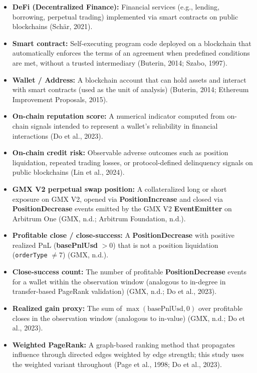 \begin{itemize}
\item[\textbullet] \textbf{DeFi (Decentralized Finance): }Financial services (e.g., lending, borrowing, perpetual trading) implemented via smart contracts on public blockchains (Sch\"{a}r, 2021).
\item[\textbullet] \textbf{Smart contract: }Self-executing program code deployed on a blockchain that automatically enforces the terms of an agreement when predefined conditions are met, without a trusted intermediary (Buterin, 2014; Szabo, 1997).
\item[\textbullet] \textbf{Wallet / Address: }A blockchain account that can hold assets and interact with smart contracts (used as the unit of analysis) (Buterin, 2014; Ethereum Improvement Proposals, 2015).
\item[\textbullet] \textbf{On-chain reputation score: }A numerical indicator computed from on-chain signals intended to represent a wallet's reliability in financial interactions (Do et al., 2023).
\item[\textbullet] \textbf{On-chain credit risk: }Observable adverse outcomes such as position liquidation, repeated trading losses, or protocol-defined delinquency signals on public blockchains (Lin et al., 2024).
\item[\textbullet] \textbf{GMX V2 perpetual swap position: }A collateralized long or short exposure on GMX V2, opened via \textbf{PositionIncrease} and closed via \textbf{PositionDecrease} events emitted by the GMX V2 \textbf{EventEmitter} on Arbitrum One (GMX, n.d.; Arbitrum Foundation, n.d.).
\item[\textbullet] \textbf{Profitable close / close-success: }A \textbf{PositionDecrease} with positive realized PnL (\textbf{basePnlUsd} $> 0$) that is not a position liquidation (\texttt{orderType} $\neq 7$) (GMX, n.d.).
\item[\textbullet] \textbf{Close-success count: }The number of profitable \textbf{PositionDecrease} events for a wallet within the observation window (analogous to in-degree in transfer-based PageRank validation) (GMX, n.d.; Do et al., 2023).
\item[\textbullet] \textbf{Realized gain proxy: }The sum of $\max(\text{basePnlUsd}, 0)$ over profitable closes in the observation window (analogous to in-value) (GMX, n.d.; Do et al., 2023).
\item[\textbullet] \textbf{Weighted PageRank: }A graph-based ranking method that propagates influence through directed edges weighted by edge strength; this study uses the weighted variant throughout (Page et al., 1998; Do et al., 2023).

\end{itemize}
